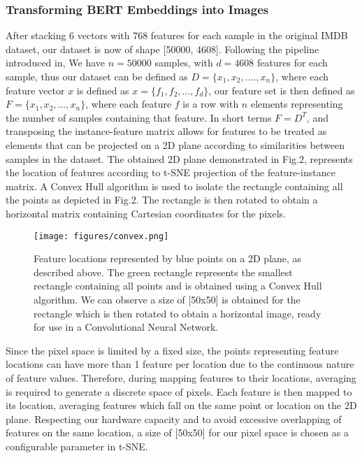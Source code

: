 \documentclass[conference]{IEEEtran}
\begin{document}
\subsubsection{Transforming BERT Embeddings into Images}
                After stacking 6 vectors with 768 features for each sample in the original IMDB~\cite{imdb} dataset, our dataset is now of shape [50000, 4608]. Following the pipeline introduced in\cite{deepinsight}, We have $n=50000$ samples, with $d=4608$ features for each sample, thus our dataset can be defined as $D={\{x_1,x_2,....,x_n}\}$, where each feature vector $x$ is defined as $x=\{f_1,f_2,...,f_d\}$, our feature set is then defined as $F=\{x_1,x_2,...,x_n\}$, where each feature $f$ is a row with $n$ elements representing the number of samples containing that feature. In short terms $F=D^T$, and transposing the instance-feature matrix allows for features to be treated as elements that can be projected on a 2D plane according to similarities between samples in the dataset. The obtained 2D plane demonstrated in Fig.2, represents the location of features according to t-SNE projection of the feature-instance matrix. A Convex Hull algorithm is used to isolate the rectangle containing all the points as depicted in Fig.2. The rectangle is then rotated to obtain a horizontal matrix containing Cartesian coordinates for the pixels. 
                
                \begin{figure}[htpb]
                \centerline{\texttt{[image: figures/convex.png]}}
                \caption{Feature locations represented by blue points on a 2D plane, as described above. The green rectangle represents the smallest rectangle containing all points and is obtained using a Convex Hull algorithm. We can observe a size of [50x50] is obtained for the rectangle which is then rotated to obtain a horizontal image, ready for use in a Convolutional Neural Network.}
                \label{figure-2}
                \end{figure}
                
                Since the pixel space is limited by a fixed size, the points representing feature locations can have more than 1 feature per location due to the continuous nature of feature values. Therefore, during mapping features to their locations, averaging is required to generate a discrete space of pixels. Each feature is then mapped to its location, averaging features which fall on the same point or location on the 2D plane. Respecting our hardware capacity and to avoid excessive overlapping of features on the same location, a size of [50x50] for our pixel space is chosen as a configurable parameter in t-SNE. 
                
\end{document}
